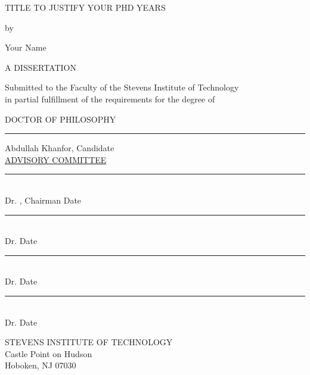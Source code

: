 \documentclass[12pt]{report}
\newcommand{\thesistitle}{TITLE TO JUSTIFY YOUR PHD YEARS}
\newcommand{\thesisauthor}{Your Name}
\newcommand{\thesisname}{Abdullah Khanfor}
\newcommand{\thesischairadvisor}{Dr. }    %
\newcommand{\committeenameA}{Dr. }
\newcommand{\committeenameB}{Dr. }
\newcommand{\committeenameC}{Dr. }
\newcommand{\graddate}{\the\year} %
\begin{document}

\thispagestyle{empty}
\begin{center}
{
  {\thesistitle}
  \vspace{.15in}
  
    by
    
  \vspace{.15in}
  \thesisauthor
  
  \vspace{.15in}
  
 {A DISSERTATION}\\
  \vspace{.2in}
  \begin{spacing}{1}
    {Submitted to the Faculty of the Stevens Institute of Technology\\
    in partial fulfillment of the requirements for the degree of}
    \end{spacing}
  \vspace{.2in}
  
  {DOCTOR OF PHILOSOPHY}\\
  \vspace{1.0in}
    \hfill 
    \begin{minipage}{80mm}
    \begin{spacing}{ }\noindent \rule{3.2in}{0.1mm}
        \thesisname, Candidate\\[3mm]
        \underline{ADVISORY COMMITTEE}\\[3mm]
        \noindent \rule{3.2in}{0.1mm}\\[-1.3mm]
        {\thesischairadvisor}, Chairman  \hfill{Date}\\[2mm]
        {\noindent \rule{3.2in}{0.1mm}}\\[-1.3mm]
        {\committeenameA}        \hfill{Date}\\[2mm]
        {\noindent \rule{3.2in}{0.1mm}}\\[-1.3mm]
        {\committeenameB}        \hfill{Date}\\[2mm]
        {\noindent \rule{3.2in}{0.1mm}}\\[-1.3mm]
        {\committeenameC}        \hfill{Date}\\[2mm]
    \end{spacing}
  \end{minipage}
  \vfill
  
  {STEVENS INSTITUTE OF TECHNOLOGY\\
  \vspace{-0.05in}
  Castle Point on Hudson\\
  Hoboken, NJ 07030
  }

  {\graddate}
}

\end{center}
\end{document}
